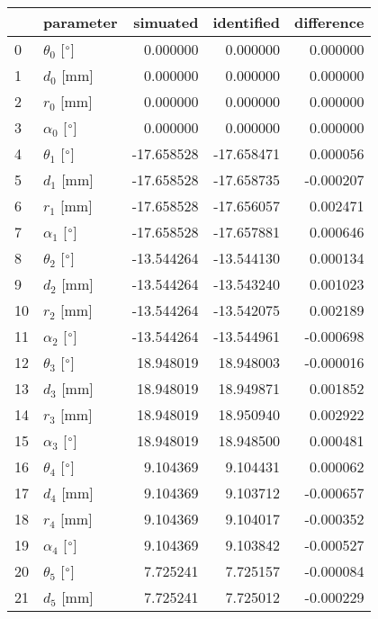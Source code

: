 \documentclass{standalone}%
\begin{document}
%
\normalsize%
\begin{tabular}{llrrr}
\toprule
{} &                 parameter &   simuated & identified & difference \\
\midrule
0  &  $\theta_{0}$ [$\degree$] &   0.000000 &   0.000000 &   0.000000 \\
1  &              $d_{0}$ [mm] &   0.000000 &   0.000000 &   0.000000 \\
2  &              $r_{0}$ [mm] &   0.000000 &   0.000000 &   0.000000 \\
3  &  $\alpha_{0}$ [$\degree$] &   0.000000 &   0.000000 &   0.000000 \\
4  &  $\theta_{1}$ [$\degree$] & -17.658528 & -17.658471 &   0.000056 \\
5  &              $d_{1}$ [mm] & -17.658528 & -17.658735 &  -0.000207 \\
6  &              $r_{1}$ [mm] & -17.658528 & -17.656057 &   0.002471 \\
7  &  $\alpha_{1}$ [$\degree$] & -17.658528 & -17.657881 &   0.000646 \\
8  &  $\theta_{2}$ [$\degree$] & -13.544264 & -13.544130 &   0.000134 \\
9  &              $d_{2}$ [mm] & -13.544264 & -13.543240 &   0.001023 \\
10 &              $r_{2}$ [mm] & -13.544264 & -13.542075 &   0.002189 \\
11 &  $\alpha_{2}$ [$\degree$] & -13.544264 & -13.544961 &  -0.000698 \\
12 &  $\theta_{3}$ [$\degree$] &  18.948019 &  18.948003 &  -0.000016 \\
13 &              $d_{3}$ [mm] &  18.948019 &  18.949871 &   0.001852 \\
14 &              $r_{3}$ [mm] &  18.948019 &  18.950940 &   0.002922 \\
15 &  $\alpha_{3}$ [$\degree$] &  18.948019 &  18.948500 &   0.000481 \\
16 &  $\theta_{4}$ [$\degree$] &   9.104369 &   9.104431 &   0.000062 \\
17 &              $d_{4}$ [mm] &   9.104369 &   9.103712 &  -0.000657 \\
18 &              $r_{4}$ [mm] &   9.104369 &   9.104017 &  -0.000352 \\
19 &  $\alpha_{4}$ [$\degree$] &   9.104369 &   9.103842 &  -0.000527 \\
20 &  $\theta_{5}$ [$\degree$] &   7.725241 &   7.725157 &  -0.000084 \\
21 &              $d_{5}$ [mm] &   7.725241 &   7.725012 &  -0.000229 \\

\end{tabular}
\end{document}
